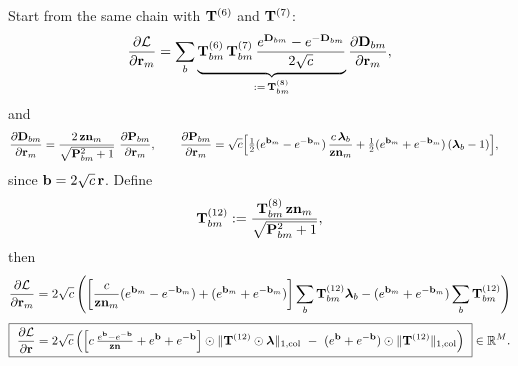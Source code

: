 \documentclass{article}
\begin{document}
Start from the same chain with $\T{6}$ and $\T{7}$:
\[
\ddfrac{\mathcal{L}}{\v{r}{m}}
= \sum_b \underbrace{\T{6}{bm}\,\T{7}{bm}\,\frac{\ev{D}{bm}-\ev{-D}{bm}}{2\sqrt{c}}}_{:=\,\T{8}{bm}}
\ddfrac{\v{D}{bm}}{\v{r}{m}},
\]
and
\begin{align}
\ddfrac{\v{D}{bm}}{\v{r}{m}}
&= \frac{2\,\v{zn}{m}}{\sqrt{\v{P}{bm}^2+1}}\ \ddfrac{\v{P}{bm}}{\v{r}{m}},\qquad
\ddfrac{\v{P}{bm}}{\v{r}{m}}
= \sqrt{c}\Big[\tfrac12(\ev{b}{m}-\ev{-b}{m})\,\frac{c\,\lam_b}{\v{zn}{m}}
+ \tfrac12(\ev{b}{m}+\ev{-b}{m})\,(\lam_b-1)\Big],
\end{align}
since $\v{b}=2\sqrt{c}\,\v{r}$. Define
\[
\T{12}{bm}:=\frac{\T{8}{bm}\,\v{zn}{m}}{\sqrt{\v{P}{bm}^2+1}},
\]
then
\[
\ddfrac{\mathcal{L}}{\v{r}{m}}
= 2\sqrt{c}\left(
\left[\frac{c}{\v{zn}{m}}(\ev{b}{m}-\ev{-b}{m}) + (\ev{b}{m}+\ev{-b}{m})\right]\sum_b \T{12}{bm}\lam_b
- (\ev{b}{m}+\ev{-b}{m})\sum_b \T{12}{bm}
\right)
\]
\[
\boxed{\ \ddfrac{\mathcal{L}}{\v{r}} =
2\sqrt{c}\left(
\Big[c\,\tfrac{\ev{b}-\ev{-b}}{\v{zn}}+\ev{b}+\ev{-b}\Big]\had \colnorm{\T{12}\had\v{\lam}}
\ -\ (\ev{b}+\ev{-b})\had \colnorm{\T{12}}
\right)\ }\in\mathbb{R}^{M}.
\]
\end{document}

